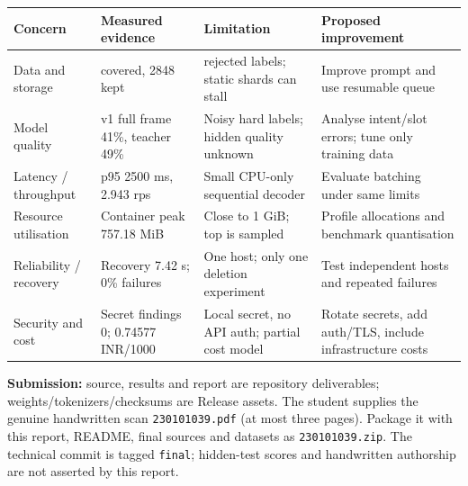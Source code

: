 \documentclass[10pt,a4paper]{article}
\begin{document}
\begin{center}\small\begin{tabularx}{\linewidth}{@{}>{\raggedright\arraybackslash}X>{\raggedright\arraybackslash}X>{\raggedright\arraybackslash}X>{\raggedright\arraybackslash}X@{}}\toprule

\textbf{Concern} & \textbf{Measured evidence} & \textbf{Limitation} & \textbf{Proposed improvement} \\ \midrule

Data and storage & 3000 covered, 2848 kept & 103 rejected labels; static shards can stall & Improve prompt and use resumable queue \\

Model quality & v1 full frame 41\%, teacher 49\% & Noisy hard labels; hidden quality unknown & Analyse intent/slot errors; tune only training data \\

Latency / throughput & p95 2500 ms, 2.943 rps & Small CPU-only sequential decoder & Evaluate batching under same limits \\

Resource utilisation & Container peak 757.18 MiB & Close to 1 GiB; top is sampled & Profile allocations and benchmark quantisation \\

Reliability / recovery & Recovery 7.42 s; 0\% failures & One host; only one deletion experiment & Test independent hosts and repeated failures \\

Security and cost & Secret findings 0; 0.74577 INR/1000 & Local secret, no API auth; partial cost model & Rotate secrets, add auth/TLS, include infrastructure costs \\

\bottomrule\end{tabularx}\end{center}

\textbf{Submission:} source, results and report are repository deliverables; weights/tokenizers/checksums are Release assets. The student supplies the genuine handwritten scan \texttt{230101039.pdf} (at most three pages). Package it with this report, README, final sources and datasets as \texttt{230101039.zip}. The technical commit is tagged \texttt{final}; hidden-test scores and handwritten authorship are not asserted by this report.
\end{document}

